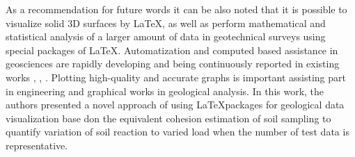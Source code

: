\documentclass[a4paper,10pt]{article}
\begin{document}
As a recommendation for future words it can be also noted that it is possible to visualize solid 3D surfaces by \LaTeX, as well as perform mathematical and statistical analysis of a larger amount of data in geotechnical surveys using special packages of \LaTeX. Automatization and computed based assistance in geosciences are rapidly developing and being continuously reported in existing works \cite{Schenke}, \cite{Lemenkova201995}, \cite{Lemenkova201994}. Plotting high-quality and accurate graphs is important assisting part in engineering and graphical works in geological analysis. In this work, the authors presented a novel approach of using \LaTeX \space packages for geological data visualization base don the equivalent cohesion estimation of soil sampling to quantify variation of soil reaction to varied load when the number of test data is representative. 





\end{document}
